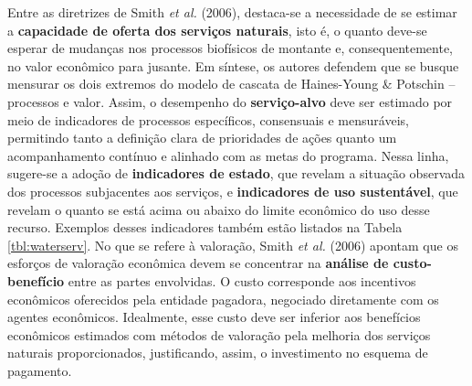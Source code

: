 \documentclass[./main.tex]{subfiles}
\begin{document}
\par Entre as diretrizes de Smith \textit{et al.} (2006), destaca-se a necessidade de se estimar a \textbf{capacidade de oferta dos serviços naturais}, isto é, o quanto deve-se esperar de mudanças nos processos biofísicos de montante e, consequentemente, no valor econômico para jusante. Em síntese, os autores defendem que se busque mensurar os dois extremos do modelo de cascata de Haines-Young \& Potschin -- processos e valor. Assim, o desempenho do \textbf{serviço-alvo} deve ser estimado por meio de indicadores de processos específicos, consensuais e mensuráveis, permitindo tanto a definição clara de prioridades de ações quanto um acompanhamento contínuo e alinhado com as metas do programa. Nessa linha, sugere-se a adoção de \textbf{indicadores de estado}, que revelam a situação observada dos processos subjacentes aos serviços, e \textbf{indicadores de uso sustentável}, que revelam o quanto se está acima ou abaixo do limite econômico do uso desse recurso. Exemplos desses indicadores também estão listados na Tabela \ref{tbl:waterserv}. No que se refere à valoração, Smith \textit{et al.} (2006) apontam que os esforços de valoração econômica devem se concentrar na \textbf{análise de custo-benefício} entre as partes envolvidas. O custo corresponde aos incentivos econômicos oferecidos pela entidade pagadora, negociado diretamente com os agentes econômicos. Idealmente, esse custo deve ser inferior aos benefícios econômicos estimados com métodos de valoração pela melhoria dos serviços naturais proporcionados, justificando, assim, o investimento no esquema de pagamento. 
\end{document}
